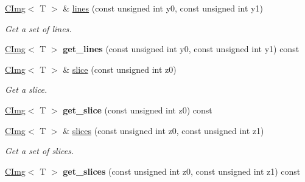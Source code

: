 \begin{DoxyCompactItemize}
\item 
\hypertarget{structcimg__library_1_1CImg_a583e6f289691013d6d863d98ec20631e}{
\hyperlink{structcimg__library_1_1CImg}{CImg}$<$ T $>$ \& \hyperlink{structcimg__library_1_1CImg_a583e6f289691013d6d863d98ec20631e}{lines} (const unsigned int y0, const unsigned int y1)}
\label{structcimg__library_1_1CImg_a583e6f289691013d6d863d98ec20631e}

\begin{DoxyCompactList}\small\item\em Get a set of lines. \item\end{DoxyCompactList}\item 
\hypertarget{structcimg__library_1_1CImg_a27cc2acc265a0ac0b96bf9b4ceb63d41}{
\hyperlink{structcimg__library_1_1CImg}{CImg}$<$ T $>$ {\bfseries get\_\-lines} (const unsigned int y0, const unsigned int y1) const }
\label{structcimg__library_1_1CImg_a27cc2acc265a0ac0b96bf9b4ceb63d41}

\item 
\hypertarget{structcimg__library_1_1CImg_a865128dbd1524185b74ddb8ddf30e362}{
\hyperlink{structcimg__library_1_1CImg}{CImg}$<$ T $>$ \& \hyperlink{structcimg__library_1_1CImg_a865128dbd1524185b74ddb8ddf30e362}{slice} (const unsigned int z0)}
\label{structcimg__library_1_1CImg_a865128dbd1524185b74ddb8ddf30e362}

\begin{DoxyCompactList}\small\item\em Get a slice. \item\end{DoxyCompactList}\item 
\hypertarget{structcimg__library_1_1CImg_ac5b89f401484d2085ac53b477922ff34}{
\hyperlink{structcimg__library_1_1CImg}{CImg}$<$ T $>$ {\bfseries get\_\-slice} (const unsigned int z0) const }
\label{structcimg__library_1_1CImg_ac5b89f401484d2085ac53b477922ff34}

\item 
\hypertarget{structcimg__library_1_1CImg_af7121006079849bc3c0c165bbe9c3a2d}{
\hyperlink{structcimg__library_1_1CImg}{CImg}$<$ T $>$ \& \hyperlink{structcimg__library_1_1CImg_af7121006079849bc3c0c165bbe9c3a2d}{slices} (const unsigned int z0, const unsigned int z1)}
\label{structcimg__library_1_1CImg_af7121006079849bc3c0c165bbe9c3a2d}

\begin{DoxyCompactList}\small\item\em Get a set of slices. \item\end{DoxyCompactList}\item 
\hypertarget{structcimg__library_1_1CImg_aeca37cd39cca6c4ff52d2f0bdd87e965}{
\hyperlink{structcimg__library_1_1CImg}{CImg}$<$ T $>$ {\bfseries get\_\-slices} (const unsigned int z0, const unsigned int z1) const }
\label{structcimg__library_1_1CImg_aeca37cd39cca6c4ff52d2f0bdd87e965}


\end{DoxyCompactItemize}

